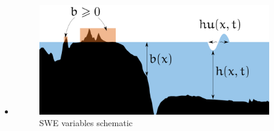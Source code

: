 \begin{frame}
\begin{columns}
\begin{column}{0.4\textwidth}
\end{column}
\begin{column}{0.6\textwidth}  %
\begin{itemize}[leftmargin=*]
\item<3->[]
\vspace{2cm}
\begin{center}
\begin{figure}
\includegraphics[scale=0.32]{./Resources/Images/swe_edit.png}%
\caption{SWE variables schematic \footnotemark}
\label{fig:swechemedit}
\end{figure}
\end{center}
\end{itemize}
\end{column}
\end{columns}
\vspace{-2em}
{}

\end{frame}
\clearpage



